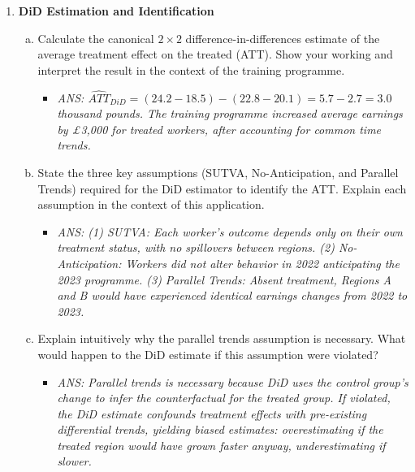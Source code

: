 \documentclass[12pt,a4paper]{article}
\newcommand{\ans}[1]{\begin{itemize}\item[$\bullet$] \textit{ANS: #1}\end{itemize}}
\begin{document}
\begin{enumerate}
\item \textbf{DiD Estimation and Identification}
\begin{enumerate}[(a)]
\item Calculate the canonical $2\times2$ difference-in-differences estimate of the average treatment effect on the treated (ATT). Show your working and interpret the result in the context of the training programme.
\ans{$\widehat{ATT}_{DiD} = (24.2-18.5)-(22.8-20.1) = 5.7-2.7 = 3.0$ thousand pounds. The training programme increased average earnings by \pounds3,000 for treated workers, after accounting for common time trends.}

\item State the three key assumptions (SUTVA, No-Anticipation, and Parallel Trends) required for the DiD estimator to identify the ATT. Explain each assumption in the context of this application.
\ans{(1) SUTVA: Each worker's outcome depends only on their own treatment status, with no spillovers between regions. (2) No-Anticipation: Workers did not alter behavior in 2022 anticipating the 2023 programme. (3) Parallel Trends: Absent treatment, Regions A and B would have experienced identical earnings changes from 2022 to 2023.}

\item Explain intuitively why the parallel trends assumption is necessary. What would happen to the DiD estimate if this assumption were violated?
\ans{Parallel trends is necessary because DiD uses the control group's change to infer the counterfactual for the treated group. If violated, the DiD estimate confounds treatment effects with pre-existing differential trends, yielding biased estimates: overestimating if the treated region would have grown faster anyway, underestimating if slower.}
\end{enumerate}


\end{enumerate}
\end{document}
